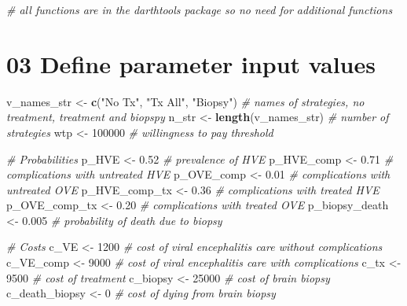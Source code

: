 \documentclass[
]{article}
\newenvironment{Shaded}{\begin{snugshade}}{\end{snugshade}}
\newcommand{\CommentTok}[1]{\textcolor[rgb]{0.56,0.35,0.01}{\textit{#1}}}
\newcommand{\DecValTok}[1]{\textcolor[rgb]{0.00,0.00,0.81}{#1}}
\newcommand{\FloatTok}[1]{\textcolor[rgb]{0.00,0.00,0.81}{#1}}
\newcommand{\FunctionTok}[1]{\textcolor[rgb]{0.13,0.29,0.53}{\textbf{#1}}}
\newcommand{\NormalTok}[1]{#1}
\newcommand{\OtherTok}[1]{\textcolor[rgb]{0.56,0.35,0.01}{#1}}
\newcommand{\StringTok}[1]{\textcolor[rgb]{0.31,0.60,0.02}{#1}}
\begin{document}
\begin{Shaded}
\begin{Highlighting}[]
\CommentTok{\# all functions are in the darthtools package so no need for additional functions}
\end{Highlighting}
\end{Shaded}

\hypertarget{define-parameter-input-values}{%
\section{03 Define parameter input
values}\label{define-parameter-input-values}}

\begin{Shaded}
\begin{Highlighting}[]
\NormalTok{v\_names\_str    }\OtherTok{\textless{}{-}} \FunctionTok{c}\NormalTok{(}\StringTok{"No Tx"}\NormalTok{, }\StringTok{"Tx All"}\NormalTok{, }\StringTok{"Biopsy"}\NormalTok{)  }\CommentTok{\# names of strategies, no treatment, treatment and biopspy}
\NormalTok{n\_str          }\OtherTok{\textless{}{-}} \FunctionTok{length}\NormalTok{(v\_names\_str)             }\CommentTok{\# number of strategies}
\NormalTok{wtp            }\OtherTok{\textless{}{-}} \DecValTok{100000}                          \CommentTok{\# willingness to pay threshold}

\CommentTok{\# Probabilities}
\NormalTok{p\_HVE          }\OtherTok{\textless{}{-}} \FloatTok{0.52}   \CommentTok{\# prevalence of HVE}
\NormalTok{p\_HVE\_comp     }\OtherTok{\textless{}{-}} \FloatTok{0.71}   \CommentTok{\# complications with untreated HVE}
\NormalTok{p\_OVE\_comp     }\OtherTok{\textless{}{-}} \FloatTok{0.01}   \CommentTok{\# complications with untreated OVE}
\NormalTok{p\_HVE\_comp\_tx  }\OtherTok{\textless{}{-}} \FloatTok{0.36}   \CommentTok{\# complications with treated HVE}
\NormalTok{p\_OVE\_comp\_tx  }\OtherTok{\textless{}{-}} \FloatTok{0.20}   \CommentTok{\# complications with treated OVE}
\NormalTok{p\_biopsy\_death }\OtherTok{\textless{}{-}} \FloatTok{0.005}  \CommentTok{\# probability of death due to biopsy}

\CommentTok{\# Costs}
\NormalTok{c\_VE           }\OtherTok{\textless{}{-}} \DecValTok{1200}   \CommentTok{\# cost of viral encephalitis care without complications}
\NormalTok{c\_VE\_comp      }\OtherTok{\textless{}{-}} \DecValTok{9000}   \CommentTok{\# cost of viral encephalitis care with complications}
\NormalTok{c\_tx           }\OtherTok{\textless{}{-}} \DecValTok{9500}   \CommentTok{\# cost of treatment}
\NormalTok{c\_biopsy       }\OtherTok{\textless{}{-}} \DecValTok{25000}  \CommentTok{\# cost of brain biopsy}
\NormalTok{c\_death\_biopsy }\OtherTok{\textless{}{-}} \DecValTok{0}      \CommentTok{\# cost of dying from brain biopsy}


\end{Highlighting}
\end{Shaded}
\end{document}
